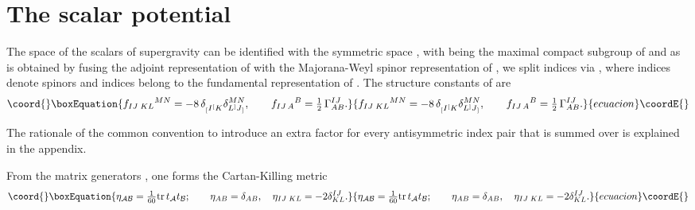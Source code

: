 \documentclass[a4paper,12pt]{article}
\begin{document}
\section{The scalar potential}

The space of the \coordHE{} scalars of \coordHE{} supergravity can be
identified with the symmetric space \coordHE{}, with \coordHE{}
being the maximal compact subgroup of \coordHE{} and
as \coordHE{} is obtained by fusing the adjoint representation of
\coordHE{} with the Majorana-Weyl spinor representation of \coordHE{}, we
split \coordHE{} indices \coordHE{} via
\coordHE{}, where indices \coordHE{} denote \coordHE{}
spinors and indices \coordHE{} belong to the fundamental
representation of \coordHE{}. The structure constants of \coordHE{} are
\begin{equation}\coord{}\boxEquation{
f_{IJ\;KL}{}^{MN}=-8\,\delta_{{}_[I{}^[K}^{\phantom{MN}}\delta_{L{}^]J{}_]}^{MN},\qquad
f_{IJ\,A}{}^{B}={\textstyle \frac{1}{2}}\,\Gamma^{IJ}_{AB}.
}{
f_{IJ\;KL}{}^{MN}=-8\,\delta_{{}_[I{}^[K}^{\phantom{MN}}\delta_{L{}^]J{}_]}^{MN},\qquad
f_{IJ\,A}{}^{B}={\textstyle \frac{1}{2}}\,\Gamma^{IJ}_{AB}.
}{ecuacion}\coordE{}\end{equation}

The rationale of the common convention to introduce an extra factor
\coordHE{} for every antisymmetric index pair \myHighlight{$[IJ]$}\coordHE{} that is summed over is
explained in the appendix.

From the \coordHE{} matrix generators
\coordHE{},
one forms the Cartan-Killing metric
\begin{equation}\coord{}\boxEquation{
\eta_{\mathcal{A}\mathcal{B}}={\textstyle \frac{1}{60}}\tr t_\mathcal{A}t_\mathcal{B};\qquad\eta_{AB}=\delta_{AB},\quad\eta_{IJ\;KL}=-2\delta^{IJ}_{KL}.
}{
\eta_{\mathcal{A}\mathcal{B}}={\textstyle \frac{1}{60}}\tr t_\mathcal{A}t_\mathcal{B};\qquad\eta_{AB}=\delta_{AB},\quad\eta_{IJ\;KL}=-2\delta^{IJ}_{KL}.
}{ecuacion}\coordE{}\end{equation}
\end{document}
